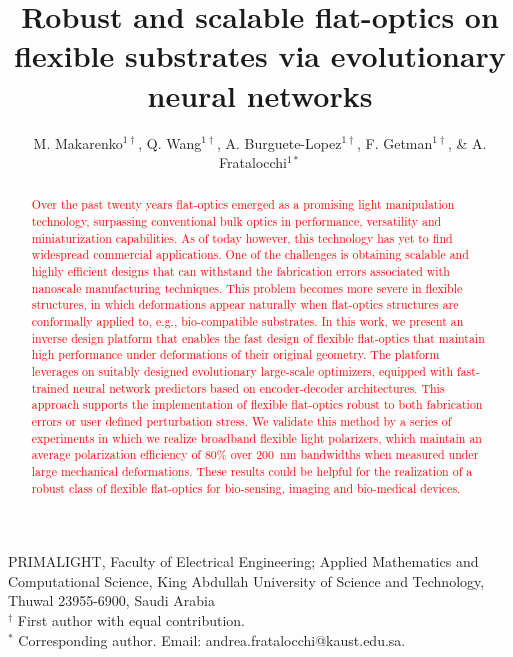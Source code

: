 \documentclass[two-columns]{nature}
\author{M. Makarenko$^{1\dag}$,  Q. Wang$^{1\dag}$,  A.
Burguete-Lopez$^{1\dag}$,  F. Getman$^{1\dag}$,
\& A. Fratalocchi$^{1*}$}
\newcommand{\rev}[1]{\textcolor{red}{#1}}
\begin{document}
\title{Robust and scalable flat-optics on flexible substrates via evolutionary neural networks}

\maketitle

\begin{affiliations}
\item PRIMALIGHT, Faculty of Electrical Engineering; Applied
	Mathematics and Computational Science, King Abdullah University of Science and
	Technology, Thuwal 23955-6900, Saudi Arabia\\ $^\dag$ First author with equal
	contribution.\\ $^*$ Corresponding author. Email:
	andrea.fratalocchi@kaust.edu.sa.
\end{affiliations}


\begin{abstract}
\rev{Over the past twenty years flat-optics emerged as a promising light manipulation technology, surpassing conventional bulk optics in performance, versatility and miniaturization capabilities. As of today
    however, this technology has yet to find widespread commercial applications. One of the challenges is obtaining scalable and highly efficient designs that can withstand the
     fabrication errors associated with nanoscale manufacturing
    techniques. This problem becomes more severe in flexible structures, in which deformations appear naturally when flat-optics structures are conformally applied to, e.g., bio-compatible substrates. In this work, we present an inverse design platform that enables the
    fast design of flexible flat-optics that maintain high performance under
    deformations of their original geometry. The platform leverages on suitably
    designed evolutionary large-scale optimizers, equipped with fast-trained neural network
    predictors based on encoder-decoder architectures. This approach supports the implementation of flexible flat-optics robust to both fabrication errors or user
    defined perturbation stress. We validate this method by a series of experiments in which we realize broadband flexible light polarizers, which maintain an average
    polarization efficiency of 80\% over 200~nm bandwidths when measured under
    large mechanical deformations. These results could be helpful for the realization of a robust class of flexible flat-optics for bio-sensing, imaging and bio-medical devices.} \end{abstract}
\end{document}
